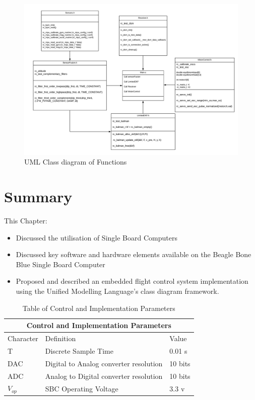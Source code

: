 \documentclass[12pt,a4paper,twoside]{report}
\begin{document}
				\begin{figure}[h!]
					\centering
					\includegraphics[width=1\linewidth]{LQG-UML-Implementation.png}
					\caption{UML Class diagram of Functions}
					\label{fig:umlfunctiondiagram}
				\end{figure}
				  
				
		\section{Summary}	
			
			This Chapter:
			\begin{itemize}
				\item 
					Discussed the utilisation of Single Board Computers 
				\item 
					Discussed key software and hardware elements available on the Beagle Bone Blue Single Board Computer  
				\item
					Proposed and described an embedded flight control system implementation using the Unified Modelling Language's class diagram framework.
			\end{itemize}
		
	\newpage
	
	\begin{table}[h!]
		\centering
		\begin{tabular}{ |p{1.5cm}|p{9.5cm}|p{5cm}|  }
			\hline
			\multicolumn{3}{|c|}{Control and Implementation Parameters} \\
			\hline
			Character& Definition  & Value  \\
			\hline
			T        &  Discrete Sample Time                        & 0.01 s\\
			DAC      &  Digital to Analog converter resolution      & 10 bits\\
			ADC      &  Analog to Digital converter resolution      & 10 bits\\
			$V_{op}$ & 	SBC Operating Voltage                       & 3.3 v\\
			\hline
		\end{tabular}
		\caption{Table of Control and Implementation Parameters}
		\label{table:controlparameters}
	\end{table}
\end{document}
